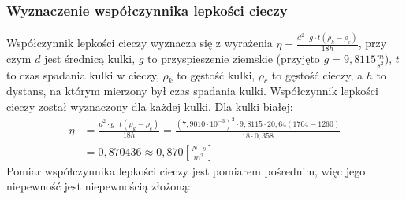 \documentclass[polish, 11pt, a4paper]{article}
\begin{document}
	\subsubsection{Wyznaczenie współczynnika lepkości cieczy}
		Współczynnik lepkości cieczy wyznacza się z wyrażenia \(\eta=\frac{d^2\cdot g\cdot t(\rho_k-\rho_c)}{18h}\), przy czym \(d\) jest średnicą kulki, \(g\) to przyspieszenie ziemskie (przyjęto \(g=9,8115 \frac{m}{s^2}\)), \(t\) to czas spadania kulki w cieczy, \(\rho_k\) to gęstość kulki, \(\rho_c\) to gęstość cieczy, a \(h\) to dystans, na którym mierzony był czas spadania kulki. Współczynnik lepkości cieczy został wyznaczony dla każdej kulki. Dla kulki białej:
		\begin{align*}
			\eta	&=\frac{d^2\cdot g\cdot t(\rho_k-\rho_c)}{18h}=\frac{(7,9010\cdot 10^{-3})^2\cdot 9,8115\cdot 20,64(1704-1260)}{18\cdot 0,358}\\
					&=0,870436\approx 0,870\left[\frac{N\cdot s}{m^2}\right]
		\end{align*}
		Pomiar współczynnika lepkości cieczy jest pomiarem pośrednim, więc jego niepewność jest niepewnością złożoną:
\end{document}
